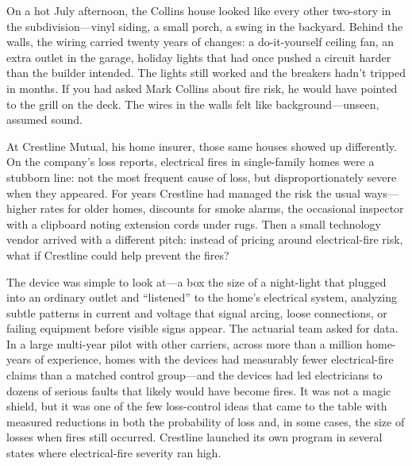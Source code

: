 \documentclass[11pt,openany]{book}
\begin{document}
\begin{corporateexample}

On a hot July afternoon, the Collins house looked like every other two-story
in the subdivision---vinyl siding, a small porch, a swing in the backyard.
Behind the walls, the wiring carried twenty years of changes: a do-it-yourself
ceiling fan, an extra outlet in the garage, holiday lights that had once
pushed a circuit harder than the builder intended. The lights still worked and
the breakers hadn't tripped in months. If you had asked Mark Collins about
fire risk, he would have pointed to the grill on the deck. The wires in the
walls felt like background---unseen, assumed sound.

At Crestline Mutual, his home insurer, those same houses showed up
differently. On the company's loss reports, electrical fires in single-family
homes were a stubborn line: not the most frequent cause of loss, but
disproportionately severe when they appeared. For years Crestline had managed
the risk the usual ways---higher rates for older homes, discounts for smoke
alarms, the occasional inspector with a clipboard noting extension cords under
rugs. Then a small technology vendor arrived with a different pitch: instead
of pricing around electrical-fire risk, what if Crestline could help prevent
the fires?

The device was simple to look at---a box the size of a night-light that
plugged into an ordinary outlet and ``listened'' to the home's electrical
system, analyzing subtle patterns in current and voltage that signal arcing,
loose connections, or failing equipment before visible signs appear. The
actuarial team asked for data. In a large multi-year pilot with other
carriers, across more than a million home-years of experience, homes with the
devices had measurably fewer electrical-fire claims than a matched control
group---and the devices had led electricians to dozens of serious faults that
likely would have become fires. It was not a magic shield, but it was one of
the few loss-control ideas that came to the table with measured reductions in
both the probability of loss and, in some cases, the size of losses when fires
still occurred. Crestline launched its own program in several states where
electrical-fire severity ran high.


\end{corporateexample}
\end{document}

